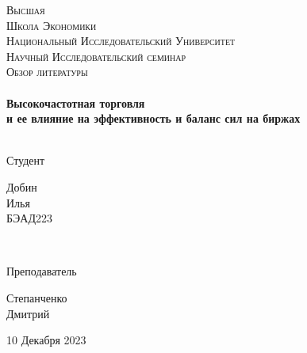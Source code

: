 \begin{titlepage}
\center %
 

\textsc{\LARGE Высшая\\[-0.2cm]Школа Экономики\\[0.1cm]\large Национальный Исследовательский Университет}\\[1.5cm] %
\textsc{\Large Научный Исследовательский семинар}\\[0.1cm] %
\textsc{\large Обзор литературы}\\[0.5cm] %


\HRule
\\[0.4cm]
{ \huge \bfseries Высокочастотная торговля\\[0.2cm]
и ее влияние на эффективность и баланс сил на биржах}
\\[0.6cm] %
\HRule
\\[1.5cm]


 

\begin{minipage}{0.4\textwidth}
	\begin{flushleft} \large
		\textsf{Студент}
		
		Добин \\[-0.15cm] Илья  \textsc{} \\[-0.15cm]
		БЭАД223
	\end{flushleft}
\end{minipage}
~
\begin{minipage}{0.4\textwidth}
	\begin{flushright} \large
		\textsf{Преподаватель}
		
	Степанченко\\[-0.15cm] Дмитрий\\[-0.15cm]
		\textsc{} %
	\end{flushright}
\end{minipage}

\begin{bottompar}
	
	{\large 10 Декабря 2023}

\end{bottompar}
\vfill %

\end{titlepage}